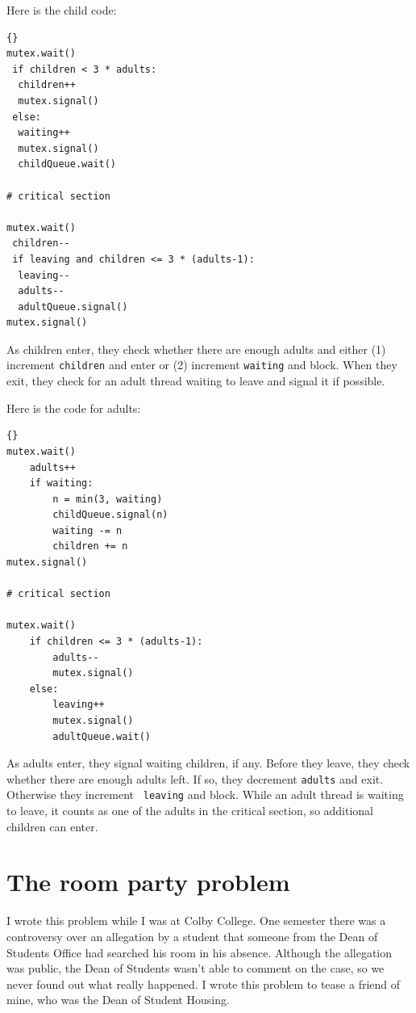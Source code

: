 \documentclass{book}
\begin{document}
Here is the child code:

\begin{lstlisting}[title={Extended child care solution (child)}]{}
mutex.wait()
 if children < 3 * adults:
  children++
  mutex.signal()
 else:
  waiting++
  mutex.signal()
  childQueue.wait()

# critical section

mutex.wait()
 children--
 if leaving and children <= 3 * (adults-1):
  leaving--
  adults--
  adultQueue.signal() 
mutex.signal()
\end{lstlisting}

As children enter, they check whether there are enough adults
and either (1) increment {\tt children} and enter or (2) increment
    {\tt waiting} and block.
When they exit, they check for an adult thread waiting to leave and
signal it if possible.

\newpage
Here is the code for adults:

\begin{lstlisting}[title={Extended child care solution (adult)}]{}
mutex.wait()
    adults++
    if waiting:
        n = min(3, waiting)
        childQueue.signal(n)
        waiting -= n
        children += n
mutex.signal()

# critical section

mutex.wait()
    if children <= 3 * (adults-1):
        adults--
        mutex.signal()
    else:
        leaving++
        mutex.signal()
        adultQueue.wait() 
\end{lstlisting}

As adults enter, they signal waiting children, if any.  Before they
leave, they check whether there are enough adults left.  If so, they
decrement {\tt adults} and exit.  Otherwise they increment {\tt
        leaving} and block.  While an adult thread is waiting to leave, it
counts as one of the adults in the critical section, so additional
children can enter.





\newpage
\section{The room party problem}

I wrote this problem while I was at Colby College.  One semester
there was a controversy over an allegation by a student that someone
from the Dean of Students Office had searched his room in his
absence.  Although the allegation was public, the Dean of Students
wasn't able to comment on the case, so we never found out what
really happened.  I wrote this problem to tease a friend of mine,
who was the Dean of Student Housing.
\end{document}
